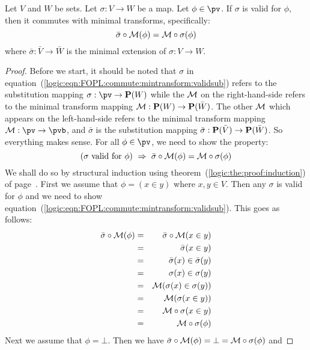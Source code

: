 \begin{theorem}\label{logic:the:FOPL:commute:mintransform:validsub}
Let $V$ and $W$ be sets. Let $\sigma:V\to W$ be a map. Let
$\phi\in\pv$. If $\sigma$ is valid for $\phi$, then it commutes with
minimal transforms, specifically:
    \begin{equation}\label{logic:eqn:FOPL:commute:mintransform:validsub}
    \bar{\sigma}\circ{\cal M}(\phi)={\cal M}\circ\sigma(\phi)
    \end{equation}
where $\bar{\sigma}:\bar{V}\to\bar{W}$ is the minimal extension of
$\sigma: V\to W$.
\end{theorem}
\begin{proof}
Before we start, it should be noted that $\sigma$ in
equation~(\ref{logic:eqn:FOPL:commute:mintransform:validsub}) refers
to the substitution mapping $\sigma:\pv\to{\bf P}(W)$ while the
${\cal M}$ on the right-hand-side refers to the minimal transform
mapping ${\cal M}:{\bf P}(W)\to{\bf P}(\bar{W})$. The other ${\cal
M}$ which appears on the left-hand-side refers to the minimal
transform mapping ${\cal M}:\pv\to\pvb$, and $\bar{\sigma}$ is the
substitution mapping $\bar{\sigma}:{\bf P}(\bar{V})\to{\bf
P}(\bar{W})$. So everything makes sense. For all $\phi\in\pv$, we
need to show the property:
    \[
    (\mbox{$\sigma$ valid for $\phi$})\ \Rightarrow\
    \bar{\sigma}\circ{\cal M}(\phi)={\cal M}\circ\sigma(\phi)
    \]
We shall do so by structural induction using
theorem~(\ref{logic:the:proof:induction}) of
page~\pageref{logic:the:proof:induction}. First we assume that
$\phi=(x\in y)$ where $x,y\in V$. Then any $\sigma$ is valid for
$\phi$ and we need to show
equation~(\ref{logic:eqn:FOPL:commute:mintransform:validsub}). This
goes as follows:
    \begin{eqnarray*}
    \bar{\sigma}\circ{\cal M}(\phi)
    &=&\bar{\sigma}\circ{\cal M}(x\in y)\\
    &=&\bar{\sigma}(x\in y)\\
    &=&\bar{\sigma}(x)\in\bar{\sigma}(y)\\
    &=&\sigma(x)\in\sigma(y)\\
    &=&{\cal M}(\sigma(x)\in\sigma(y))\\
    &=&{\cal M}(\sigma(x\in y))\\
    &=&{\cal M}\circ\sigma(x\in y)\\
    &=&{\cal M}\circ\sigma(\phi)
    \end{eqnarray*}
Next we assume that $\phi=\bot$. Then we have
$\bar{\sigma}\circ{\cal M}(\phi)=\bot={\cal M}\circ\sigma(\phi)$ and

\end{proof}
